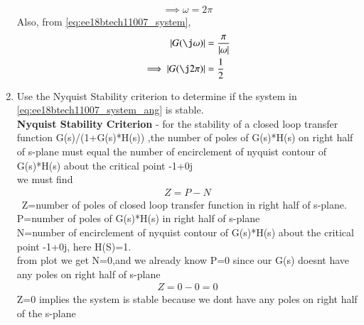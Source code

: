 \begin{enumerate}[label=\thesection.\arabic*.,ref=\thesection.\theenumi]
\begin{align}
\\
\implies \omega = 2\pi
\end{align}
Also, from \eqref{eq:ee18btech11007_system},
\begin{align}
\label{eq:ee18btech11007_system_mod}
\abs{ G(\j\omega)}&=\frac{\pi }{\abs{\omega}}
\\
\implies \abs{ G(\j2\pi)} &= \frac{1}{2}
\end{align}
%
\item Use the Nyquist Stability criterion to determine if the system in \eqref{eq:ee18btech11007_system_ang} is stable.
\\
\solution 
 \textbf{Nyquist Stability Criterion} - for  the stability of a closed loop transfer function G(s)/(1+G(s)*H(s)) ,the number of poles of G(s)*H(s) on right half of s-plane must equal the number of encirclement of nyquist contour of  G(s)*H(s) about the critical point -1+0j
\\
 we must find
\begin{align}
Z=P-N    
\end{align}
\
Z=number of poles of closed loop transfer function in right half of s-plane.
\\ 
 P=number of poles of G(s)*H(s) in right half of s-plane
\\ 
 N=number of encirclement of nyquist contour of G(s)*H(s) about the critical point -1+0j,
here H(S)=1.
\\ 
 from plot we get N=0,and we already know P=0 since our G(s) doesnt have any poles on right half of s-plane
\begin{align}
Z=0-0=0
\end{align}
Z=0 implies the system is stable because we dont have any poles on right half of the s-plane



\end{enumerate}
